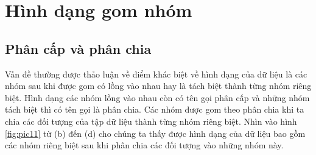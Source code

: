 
\section{Hình dạng gom nhóm}
\subsection{Phân cấp và phân chia}
Vấn đề thường được thảo luận về điểm khác biệt về hình dạng của dữ liệu là các nhóm sau khi được gom có lồng vào nhau hay là tách biệt thành từng nhóm riêng biệt.
Hình dạng các nhóm lồng vào nhau còn có tên gọi phân cấp và những nhóm tách biệt thì có tên gọi là phân chia.
Các nhóm được gom theo phân chia khi ta chia các đối tượng của tập dữ liệu thành từng nhóm riêng biệt.
Nhìn vào hình \ref{fig:pic11} từ (b) đến (d) cho chúng ta thấy được hình dạng của dữ liệu bao gồm các nhóm riêng biệt sau khi phân chia các đối tượng vào những nhóm này.


